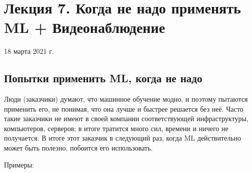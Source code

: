 \documentclass[main.tex]{subfiles}
\begin{document}
	
\section{Лекция 7. Когда не надо применять ML + Видеонаблюдение}
18 марта 2021 г.

\subsection{Попытки применить ML, когда не надо}

Люди (заказчики) думают, что машинное обучение модно, и поэтому пытаются применить его, не понимая, что она лучше и быстрее решается без неё.
Часто такие заказчики не имеют в своей компании соответствующей инфраструктуры, компьютеров, серверов; в итоге тратится много сил, времени и ничего не получается.
В итоге этот заказчик в следующий раз, когда ML действительно может быть полезно, побоится его использовать.

Примеры:
\end{document}
